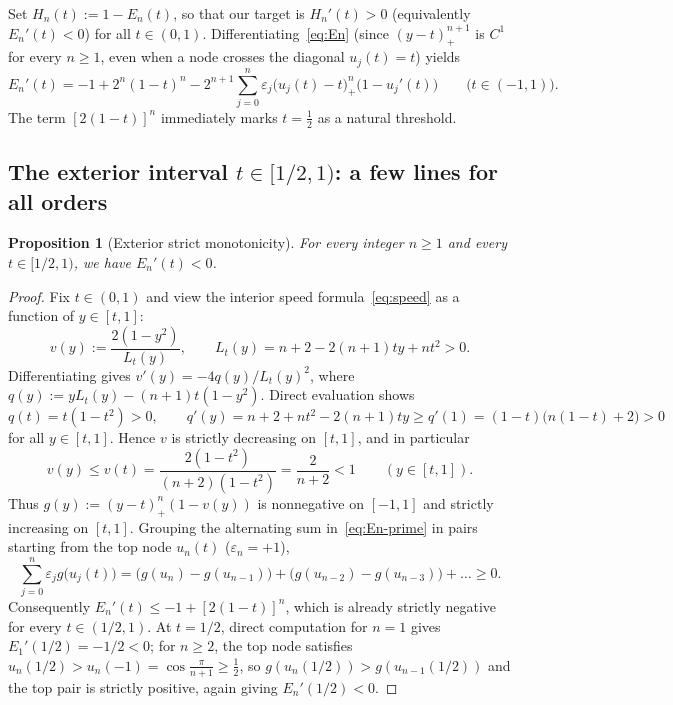 \documentclass[11pt,a4paper]{article}
\newtheorem{proposition}{Proposition}[section]
\theoremstyle{remark}
\numberwithin{equation}{section}
\begin{document}
Set $H_n(t) := 1 - E_n(t)$, so that our target is $H_n'(t) > 0$ (equivalently $E_n'(t) < 0$) for all $t \in (0,1)$. Differentiating~\eqref{eq:En} (since $(y - t)_+^{n+1}$ is $C^1$ for every $n \ge 1$, even when a node crosses the diagonal $u_j(t) = t$) yields
\begin{equation}
    E_n'(t) = -1 + 2^n(1 - t)^n
    - 2^{n+1}\sum_{j=0}^{n} \varepsilon_j \bigl(u_j(t) - t\bigr)_+^n \bigl(1 - u_j'(t)\bigr)
    \qquad \bigl(t \in (-1,1)\bigr).
    \label{eq:En-prime}
\end{equation}
The term $[2(1 - t)]^n$ immediately marks $t = \frac12$ as a natural threshold.

\subsection{The exterior interval \texorpdfstring{$t \in [1/2, 1)$}{t in [1/2, 1)}: a few lines for all orders}
\label{sec:outer}

\begin{proposition}[Exterior strict monotonicity]
    \label{prop:outer}
    For every integer $n \ge 1$ and every $t \in [1/2, 1)$, we have $E_n'(t) < 0$.
\end{proposition}

\begin{proof}
Fix $t \in (0,1)$ and view the interior speed formula~\eqref{eq:speed} as a function of $y \in [t,1]$:
\[
    v(y) := \frac{2(1 - y^2)}{L_t(y)}, \qquad L_t(y) = n + 2 - 2(n+1)ty + nt^2 > 0.
\]
Differentiating gives $v'(y) = -4q(y)/L_t(y)^2$, where $q(y) := yL_t(y) - (n+1)t(1-y^2)$. Direct evaluation shows
\[
    q(t) = t(1 - t^2) > 0,
    \qquad
    q'(y) = n + 2 + nt^2 - 2(n+1)ty \ge q'(1) = (1 - t)\bigl(n(1-t) + 2\bigr) > 0
\]
for all $y \in [t,1]$. Hence $v$ is strictly decreasing on $[t,1]$, and in particular
\[
    v(y) \le v(t) = \frac{2(1 - t^2)}{(n+2)(1 - t^2)} = \frac{2}{n+2} < 1
    \qquad (y \in [t,1]).
\]
Thus $g(y) := (y - t)_+^n(1 - v(y))$ is nonnegative on $[-1,1]$ and strictly increasing on $[t,1]$. Grouping the alternating sum in~\eqref{eq:En-prime} in pairs starting from the top node $u_n(t)$ ($\varepsilon_n = +1$),
\[
    \sum_{j=0}^{n} \varepsilon_j g\bigl(u_j(t)\bigr)
    = \bigl(g(u_n) - g(u_{n-1})\bigr)
    + \bigl(g(u_{n-2}) - g(u_{n-3})\bigr) + \dots \ge 0.
\]
Consequently $E_n'(t) \le -1 + [2(1-t)]^n$, which is already strictly negative for every $t \in (1/2, 1)$. At $t = 1/2$, direct computation for $n = 1$ gives $E_1'(1/2) = -1/2 < 0$; for $n \ge 2$, the top node satisfies $u_n(1/2) > u_n(-1) = \cos\frac{\pi}{n+1} \ge \frac12$, so $g(u_n(1/2)) > g(u_{n-1}(1/2))$ and the top pair is strictly positive, again giving $E_n'(1/2) < 0$.
\end{proof}
\end{document}
